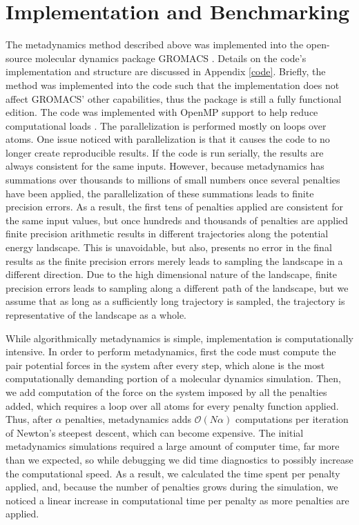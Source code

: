 \section{Implementation and Benchmarking}
The metadynamics method described above was implemented into the open-source molecular dynamics package GROMACS \cite{GROMACS}.  Details on the code's implementation and structure are discussed in Appendix \ref{code}.  Briefly, the method was implemented into the code such that the implementation does not affect GROMACS' other capabilities, thus the package is still a fully functional edition.  The code was implemented with OpenMP support to help reduce computational loads \cite{OpenMP}.  The parallelization is performed mostly on loops over atoms.  One issue noticed with parallelization is that it causes the code to no longer create reproducible results.  If the code is run serially, the results are always consistent for the same inputs.  However, because metadynamics has summations over thousands to millions of small numbers once several penalties have been applied, the parallelization of these summations leads to finite precision errors.  As a result, the first tens of penalties applied are consistent for the same input values, but once hundreds and thousands of penalties are applied finite precision arithmetic results in different trajectories along the potential energy landscape.  This is unavoidable, but also, presents no error in the final results as the finite precision errors merely leads to sampling the landscape in a different direction.  Due to the high dimensional nature of the landscape, finite precision errors leads to sampling along a different path of the landscape, but we assume that as long as a sufficiently long trajectory is sampled, the trajectory is representative of the landscape as a whole.

While algorithmically metadynamics is simple, implementation is computationally intensive.  In order to perform metadynamics, first the code must compute the pair potential forces in the system after every step, which alone is the most computationally demanding portion of a molecular dynamics simulation.  Then, we add computation of the force on the system imposed by all the penalties added, which requires a loop over all atoms for every penalty function applied.  Thus, after $\alpha$ penalties, metadynamics adds $\mathcal{O}(N\alpha)$ computations per iteration of Newton's steepest descent, which can become expensive. The initial metadynamics simulations required a large amount of computer time, far more than we expected, so while debugging we did time diagnostics to possibly increase the computational speed.  As a result, we calculated the time spent per penalty applied, and, because the number of penalties grows during the simulation, we noticed a linear increase in computational time per penalty as more penalties are applied.

